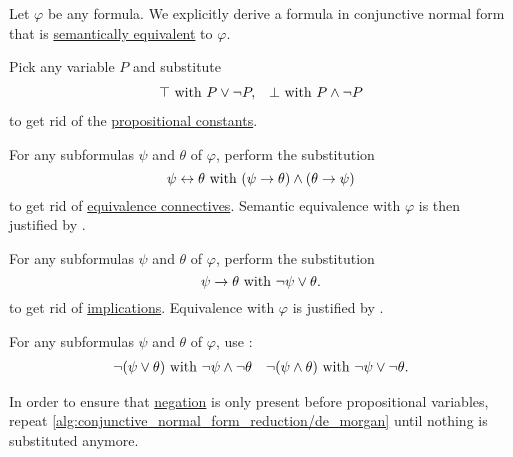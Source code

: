 \begin{algorithm}\label{alg:conjunctive_normal_form_reduction}
  Let \( \varphi \) be any formula. We explicitly derive a formula in conjunctive normal form that is \hyperref[def:propositional_interpretation/equivalence]{semantically equivalent} to \( \varphi \).

  \begin{AlgEnum}
     Pick any variable \( P \) and substitute
    \begin{align*}
      \top \text{ with } P \vee \neg P, && \bot \text{ with } P \wedge \neg P
    \end{align*}
    to get rid of the \hyperref[def:propositional_alphabet/constants]{propositional constants}.

     For any subformulas \( \psi \) and \( \theta \) of \( \varphi \), perform the substitution
    \begin{equation*}
      \psi \leftrightarrow \theta \text{ with } (\psi \rightarrow \theta) \wedge (\theta \rightarrow \psi)
    \end{equation*}
    to get rid of \hyperref[def:propositional_alphabet/connectives/equivalence]{equivalence connectives}. Semantic equivalence with \( \varphi \) is then justified by .

     For any subformulas \( \psi \) and \( \theta \) of \( \varphi \), perform the substitution
    \begin{equation*}
      \psi \rightarrow \theta \text{ with } \neg \psi \vee \theta.
    \end{equation*}
    to get rid of \hyperref[def:propositional_alphabet/connectives/implication]{implications}. Equivalence with \( \varphi \) is justified by .

     For any subformulas \( \psi \) and \( \theta \) of \( \varphi \), use :
    \begin{align*}
      \neg(\psi \vee \theta) \text{ with } \neg \psi \wedge \neg \theta
      &&
      \neg(\psi \wedge \theta) \text{ with } \neg \psi \vee \neg \theta.
    \end{align*}

    In order to ensure that \hyperref[def:propositional_alphabet/negation]{negation} is only present before propositional variables, repeat \ref{alg:conjunctive_normal_form_reduction/de_morgan} until nothing is substituted anymore.


\end{AlgEnum}
\end{algorithm}
